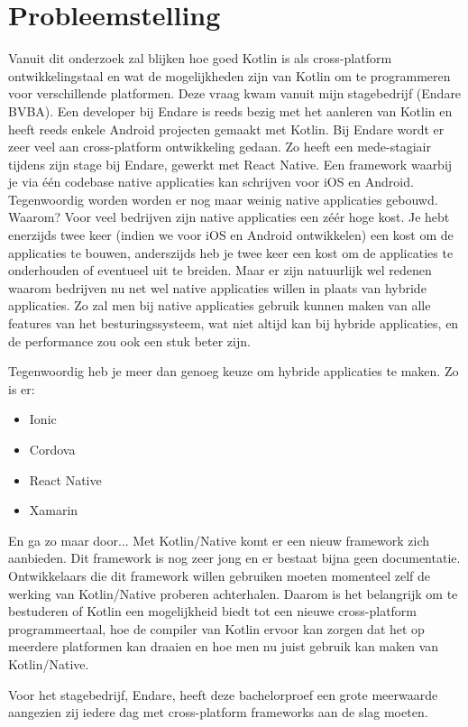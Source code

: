 \section{Probleemstelling}
\label{sec:probleemstelling}
Vanuit dit onderzoek zal blijken hoe goed Kotlin is als cross-platform ontwikkelingstaal en wat de mogelijkheden zijn van Kotlin om te programmeren voor verschillende platformen. Deze vraag kwam vanuit mijn stagebedrijf (Endare BVBA). Een developer bij Endare is reeds bezig met het aanleren van Kotlin en heeft reeds enkele Android projecten gemaakt met Kotlin. Bij Endare wordt er zeer veel aan cross-platform ontwikkeling gedaan. Zo heeft een mede-stagiair tijdens zijn stage bij Endare, gewerkt met React Native. Een framework waarbij je via één codebase native applicaties kan schrijven voor iOS en Android. Tegenwoordig worden worden er nog maar weinig native applicaties gebouwd. Waarom? Voor veel bedrijven zijn native applicaties een zéér hoge kost. Je hebt enerzijds twee keer (indien we voor iOS en Android ontwikkelen) een kost om de applicaties te bouwen, anderszijds heb je twee keer een kost om de applicaties te onderhouden of eventueel uit te breiden. Maar er zijn natuurlijk wel redenen waarom bedrijven nu net wel native applicaties willen in plaats van hybride applicaties. Zo zal men bij native applicaties gebruik kunnen maken van alle features van het besturingssysteem, wat niet altijd kan bij hybride applicaties, en de performance zou ook een stuk beter zijn. 

Tegenwoordig heb je meer dan genoeg keuze om hybride applicaties te maken. Zo is er:
\begin{itemize}
	\item Ionic
	\item Cordova
	\item React Native
	\item Xamarin
\end{itemize}
En ga zo maar door... Met Kotlin/Native komt er een nieuw framework zich aanbieden. Dit framework is nog zeer jong en er bestaat bijna geen documentatie. Ontwikkelaars die dit framework willen gebruiken moeten momenteel zelf de werking van Kotlin/Native proberen achterhalen. Daarom is het belangrijk om te bestuderen of Kotlin een mogelijkheid biedt tot een nieuwe cross-platform programmeertaal, hoe de compiler van Kotlin ervoor kan zorgen dat het op meerdere platformen kan draaien en hoe men nu juist gebruik kan maken van Kotlin/Native. 

Voor het stagebedrijf, Endare, heeft deze bachelorproef een grote meerwaarde aangezien zij iedere dag met cross-platform frameworks aan de slag moeten.

